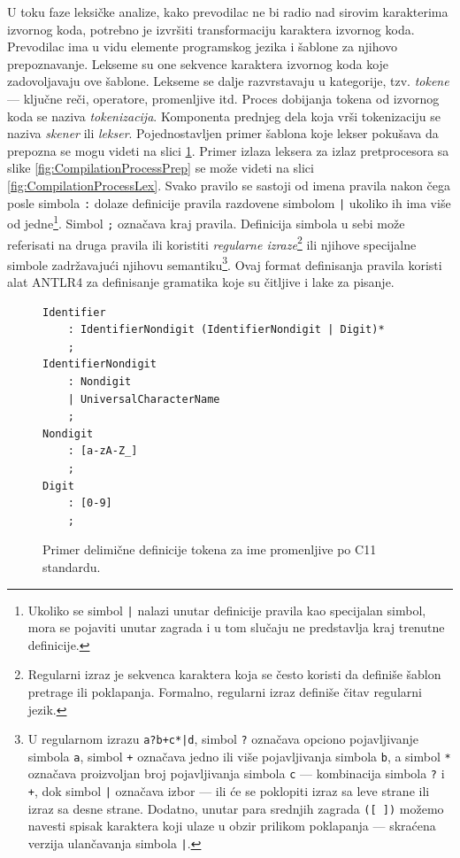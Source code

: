 U toku faze leksičke analize, kako prevodilac ne bi radio nad sirovim karakterima izvornog koda, potrebno je izvršiti transformaciju karaktera izvornog koda. Prevodilac ima u vidu elemente programskog jezika i šablone za njihovo prepoznavanje. Lekseme su one sekvence karaktera izvornog koda koje zadovoljavaju ove šablone. Lekseme se dalje razvrstavaju u kategorije, tzv. \emph{tokene} --- ključne reči, operatore, promenljive itd. Proces dobijanja tokena od izvornog koda se naziva \emph{tokenizacija}. Komponenta prednjeg dela koja vrši tokenizaciju se naziva \emph{skener} ili \emph{lekser}. Pojednostavljen primer šablona koje lekser pokušava da prepozna se mogu videti na slici \ref{fig:CLexerExample}. Primer izlaza leksera za izlaz pretprocesora sa slike \ref{fig:CompilationProcessPrep} se može videti na slici \ref{fig:CompilationProcessLex}. Svako pravilo se sastoji od imena pravila nakon čega posle simbola \texttt{:} dolaze definicije pravila razdovene simbolom \texttt{|} ukoliko ih ima više od jedne\footnote{Ukoliko se simbol \texttt{|} nalazi unutar definicije pravila kao specijalan simbol, mora se pojaviti unutar zagrada i u tom slučaju ne predstavlja kraj trenutne definicije.}. Simbol \texttt{;} označava kraj pravila. Definicija simbola u sebi može referisati na druga pravila ili koristiti \emph{regularne izraze}\footnote{Regularni izraz je sekvenca karaktera koja se često koristi da definiše šablon pretrage ili poklapanja. Formalno, regularni izraz definiše čitav regularni jezik.} ili njihove specijalne simbole zadržavajući njihovu semantiku\footnote{U regularnom izrazu \texttt{a?b+c*|d}, simbol \texttt{?} označava opciono pojavljivanje simbola \texttt{a}, simbol \texttt{+} označava jedno ili više pojavljivanja simbola \texttt{b}, a simbol \texttt{*} označava proizvoljan broj pojavljivanja simbola \texttt{c} --- kombinacija simbola \texttt{?} i \texttt{+}, dok simbol \texttt{|} označava izbor --- ili će se poklopiti izraz sa leve strane ili izraz sa desne strane. Dodatno, unutar para srednjih zagrada \texttt{([ ])} možemo navesti spisak karaktera koji ulaze u obzir prilikom poklapanja --- skraćena verzija ulančavanja simbola \texttt{|}.}. Ovaj format definisanja pravila koristi alat ANTLR4 za definisanje gramatika koje su čitljive i lake za pisanje.

\begin{figure}[h!]
\begin{lstlisting}[language={}]
Identifier 
    : IdentifierNondigit (IdentifierNondigit | Digit)*
    ;
IdentifierNondigit  
    : Nondigit
    | UniversalCharacterName
    ;
Nondigit 
    : [a-zA-Z_]
    ;
Digit 
    : [0-9]
    ;
\end{lstlisting}
\caption{Primer delimične definicije tokena za ime promenljive po C11 standardu.}
\label{fig:CLexerExample}
\end{figure}

